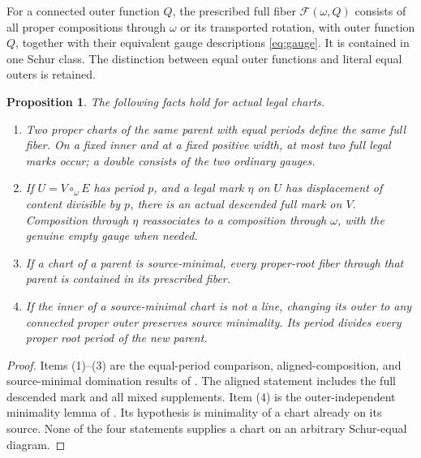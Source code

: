 \documentclass[11pt,a4paper]{amsart}
\numberwithin{equation}{section}
\theoremstyle{plain}
\newtheorem{proposition}[theorem]{Proposition}
\theoremstyle{definition}
\begin{document}
For a connected outer function \(Q\), the prescribed full fiber \(\mathcal F(\omega,Q)\) consists of all proper compositions through \(\omega\) or its transported rotation, with outer function \(Q\), together with their equivalent gauge descriptions \eqref{eq:gauge}.  It is contained in one Schur class.  The distinction between equal outer functions and literal equal outers is retained.

\begin{proposition}\label{prop:gluing-inputs}
The following facts hold for actual legal charts.
\begin{enumerate}
\item Two proper charts of the same parent with equal periods define the same full fiber.  On a fixed inner and at a fixed positive width, at most two full legal marks occur; a double consists of the two ordinary gauges.
\item If \(U=V\circ_\omega E\) has period \(p\), and a legal mark \(\eta\) on \(U\) has displacement of content divisible by \(p\), there is an actual descended full mark on \(V\).  Composition through \(\eta\) reassociates to a composition through \(\omega\), with the genuine empty gauge when needed.
\item If a chart of a parent is source-minimal, every proper-root fiber through that parent is contained in its prescribed fiber.
\item If the inner of a source-minimal chart is not a line, changing its outer to any connected proper outer preserves source minimality.  Its period divides every proper root period of the new parent.
\end{enumerate}
\end{proposition}
\begin{proof}
Items (1)--(3) are the equal-period comparison, aligned-composition,
and source-minimal domination results of \cite{Shields2026Gluing}.
The aligned statement includes the full descended mark and all mixed
supplements.  Item (4) is the outer-independent minimality lemma of
\cite{Shields2026CornerDescent}.  Its hypothesis is minimality of a chart
already on its source.  None of the four statements supplies a chart on
an arbitrary Schur-equal diagram.
\end{proof}
\end{document}
